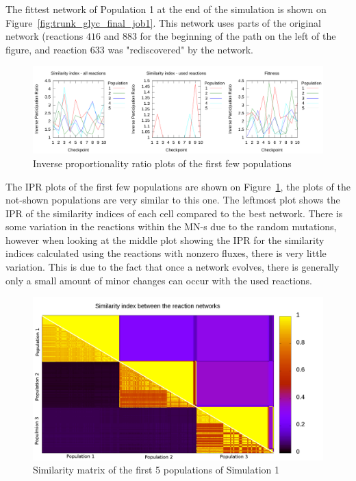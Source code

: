 \documentclass[10pt,a4paper]{article}
\begin{document}
The fittest network of Population 1 at the end of the simulation is shown on Figure~\ref{fig:trunk_glyc_final_job1}. This network uses parts of the original network (reactions $416$ and $883$ for the beginning of the path on the left of the figure, and reaction $633$ was "rediscovered" by the network. 

\begin{figure}[htpb]
	\centering
	\includegraphics[width=1\linewidth]{IPR_longerlog.pdf}
	\caption{Inverse proportionality ratio plots of the first few populations}
	\label{fig:IPR_firstrun}
\end{figure}




The IPR plots of the first few populations are shown on Figure~\ref{fig:IPR_firstrun}, the plots of the not-shown populations are very similar to this one. The leftmost plot shows the IPR of the similarity indices of each cell compared to the best network. There is some variation in the reactions within the MN-s due to the random mutations, however when looking at the middle plot showing the IPR for the similarity indices calculated using the reactions with nonzero fluxes, there is very little variation. This is due to the fact that once a network evolves, there is generally only a small amount of minor changes can occur with the used reactions. 

\begin{figure}[htpb]
	\centering
	\includegraphics[width=1\linewidth]{simmatrix_firstjob.png}
	\caption{Similarity matrix of the first 5 populations of Simulation 1}
	\label{fig:simmatrix_firstjob}
\end{figure}
\end{document}
